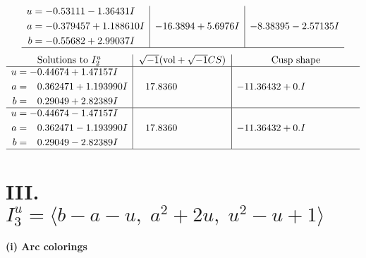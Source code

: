\documentclass[1p]{elsarticle_modified}
\theoremstyle{definition}
\newcommand{\I}{\sqrt{-1}}
\begin{document}
$$\begin{array}{c|c|c}
\begin{aligned}
u &= -0.53111 - 1.36431 I \\
a &= -0.379457 + 1.188610 I \\
b &= -0.55682 + 2.99037 I\end{aligned}
 & -16.3894 + 5.6976 I & -8.38395 - 2.57135 I\\
 \hline 
 \end{array}$$\newpage$$\begin{array}{c|c|c}  
\text{Solutions to }I^u_{2}& \I (\text{vol} + \sqrt{-1}CS) & \text{Cusp shape}\\
 \hline 
\begin{aligned}
u &= -0.44674 + 1.47157 I \\
a &= \phantom{-}0.362471 + 1.193990 I \\
b &= \phantom{-}0.29049 + 2.82389 I\end{aligned}
 & \phantom{-}17.8360\phantom{ +0.000000I} & -11.36432 + 0. I\phantom{ +0.000000I} \\ \hline\begin{aligned}
u &= -0.44674 - 1.47157 I \\
a &= \phantom{-}0.362471 - 1.193990 I \\
b &= \phantom{-}0.29049 - 2.82389 I\end{aligned}
 & \phantom{-}17.8360\phantom{ +0.000000I} & -11.36432 + 0. I\phantom{ +0.000000I}\\
 \hline 
 \end{array}$$\newpage\newpage\renewcommand{\arraystretch}{1}
\centering \section*{III. $I^u_{3}= \langle b- a- u,\;a^2+2 u,\;u^2- u+1 \rangle$}
\flushleft \textbf{(i) Arc colorings}\\
\end{document}
